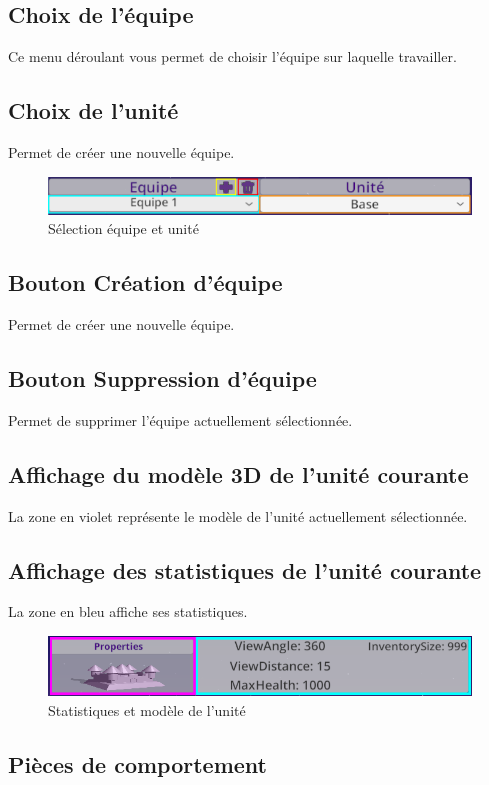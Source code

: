 \documentclass{report}
\begin{document}
\subsection{Choix de l'équipe}
Ce menu déroulant vous permet de choisir l’équipe sur laquelle travailler.
\subsection{Choix de l'unité}
Permet de créer une nouvelle équipe.
\begin{figure}[!h]
	\centering
		\includegraphics[scale=0.80]{Team_UnitSelectedArea}
	\caption{Sélection équipe et unité}
\end{figure}


\subsection{Bouton Création d'équipe}
Permet de créer une nouvelle équipe.
\subsection{Bouton Suppression d'équipe}
Permet de supprimer l’équipe actuellement sélectionnée.
\subsection{Affichage du modèle 3D de l'unité courante}
La zone en violet représente le modèle de l'unité actuellement sélectionnée.
\subsection{Affichage des statistiques de l'unité courante}
La zone en bleu affiche ses statistiques.
\begin{figure}[!h]
	\centering
		\includegraphics[scale=0.60]{StatsModeleUnitSelectedAreas}
	\caption{Statistiques et modèle de l'unité}
\end{figure}


\subsection{Pièces de comportement}
\end{document}
